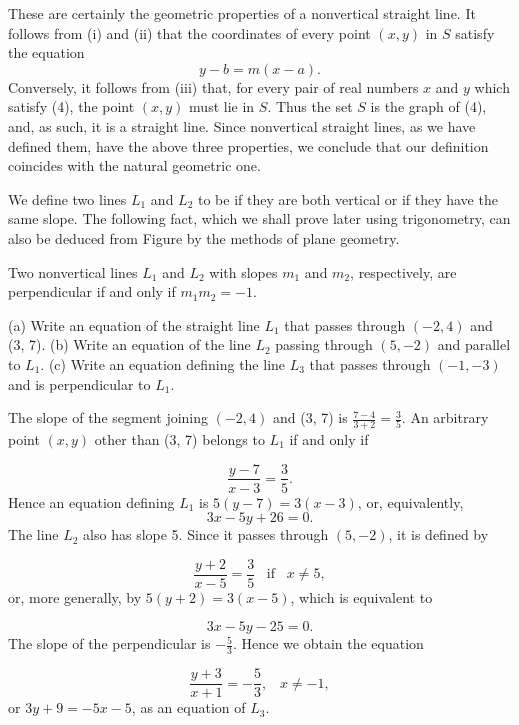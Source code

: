 These are certainly the geometric properties of a nonvertical straight line.
It follows from (i) and (ii) that the coordinates of every point $(x, y)$ in $S$ satisfy the equation
\begin{equation}
y - b = m(x - a).
\label{eq1.5.4}
\end{equation}
Conversely, it follows from (iii) that, for every pair of real numbers $x$ and $y$ which satisfy (4), the point $(x, y)$ must lie in $S$.
Thus the set $S$ is the graph of (4), and, as such, it is a straight line.
Since nonvertical straight lines, as we have defined them, have the above three properties, we conclude that our definition coincides with the natural geometric one.

We define two lines $L_1$ and $L_2$ to be  if they are both vertical or if they have the same slope.
The following fact, which we shall prove later using trigonometry, can also be deduced from Figure  by the methods of plane geometry.


\begin{prop}\label{thm 1.5.3}
Two nonvertical lines $L_1$ and $L_2$ with slopes $m_1$ and $m_2$, respectively, are perpendicular if and only if $m_{1}m_{2} = -1$.
\end{prop}

\begin{example}
\label{exam 1.5.2}
(a) Write an equation of the straight line $L_1$ that passes through $(-2, 4)$ and (3, 7).
(b) Write an equation of the line $L_2$ passing through $(5, -2)$ and parallel to $L_1$.
(c) Write an equation defining the line $L_3$ that passes through $(-1, -3)$ and is perpendicular to $L_1$.

The slope of the segment joining $(-2, 4)$ and (3, 7) is $\frac{7 - 4}{3 + 2} = \frac{3}{5}$.
An arbitrary point $(x, y)$ other than (3, 7) belongs to $L_1$ if and only if

\[
\frac{y - 7}{x - 3} = \frac{3}{5}.
\]
Hence an equation defining $L_1$ is $5(y - 7) = 3(x - 3)$, or, equivalently,
\[
3x - 5y + 26 = 0.
\]
The line $L_2$ also has slope 5.
Since it passes through $(5, -2)$, it is defined by

\[
\frac{y + 2}{x - 5} = \frac{3}{5}  \;\;\; \mbox{if} \;\;\; x \neq 5,
\]
or, more generally, by $5(y + 2) = 3(x - 5)$, which is equivalent to

\[
3x - 5y - 25 = 0.
\]
The slope of the perpendicular is $-\frac{5}{3}$.
Hence we obtain the equation

\[
\frac{y + 3}{x + 1} = - \frac{5}{3}, \;\;\;  x \neq -1,
\]
or $3y + 9 = -5x - 5$, as an equation of $L_3$.
\end{example}

